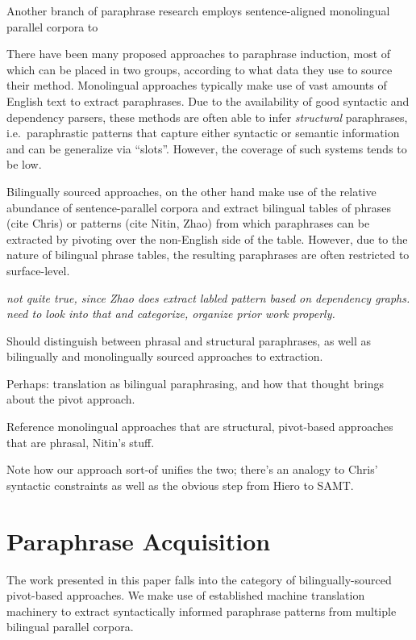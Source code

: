 \documentclass[11pt]{article}
\begin{document}
Another branch of paraphrase research employs sentence-aligned
monolingual parallel corpora \cite{Barzilay2001,Quirk2004} to

There have been many proposed approaches to paraphrase induction, most
of which can be placed in two groups, according to what data they use
to source their method. Monolingual approaches typically make use of
vast amounts of English text to extract paraphrases. Due to the
availability of good syntactic and dependency parsers, these methods
are often able to infer \emph{structural} paraphrases, i.e.\
paraphrastic patterns that capture either syntactic or semantic
information and can be generalize via ``slots''. However, the coverage
of such systems tends to be low.

Bilingually sourced approaches, on the other hand make use of the
relative abundance of sentence-parallel corpora and extract bilingual
tables of phrases (cite Chris) or patterns (cite Nitin, Zhao) from
which paraphrases can be extracted by pivoting over the non-English
side of the table. However, due to the nature of bilingual phrase
tables, the resulting paraphrases are often restricted to
surface-level.

\emph{not quite true, since Zhao does extract labled pattern based on
  dependency graphs. need to look into that and categorize, organize
  prior work properly.}

Should distinguish between phrasal and structural paraphrases, as well
as bilingually and monolingually sourced approaches to extraction.

Perhaps: translation as bilingual paraphrasing, and how that thought
brings about the pivot approach.

Reference monolingual approaches that are structural, pivot-based
approaches that are phrasal, Nitin's stuff.

Note how our approach sort-of unifies the two; there's an analogy to
Chris' syntactic constraints as well as the obvious step from Hiero to
SAMT.

\newpage

\section{Paraphrase Acquisition} \label{acquisition}

The work presented in this paper falls into the category of
bilingually-sourced pivot-based approaches. We make use of established
machine translation machinery to extract syntactically informed
paraphrase patterns from multiple bilingual parallel corpora.
\end{document}
